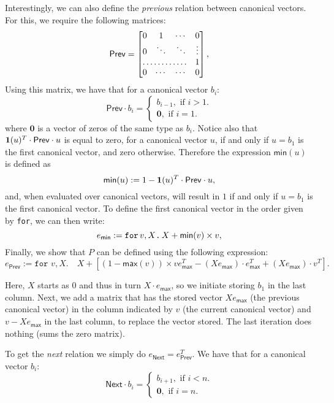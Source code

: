 Interestingly, we can also define the \textit{previous} relation between canonical vectors. 
For this, we require the following matrices:
\[
\mathsf{Prev} = \begin{bmatrix}
    0 & 1 & \cdots &  0 \\
    0 & \ddots & \ddots & \vdots \\
    \hdotsfor{3} & 1 \\
    0 & \cdots & \cdots & 0
\end{bmatrix},
\]
Using this matrix, we have that for a canonical vector $b_i$:
\[
\mathsf{Prev}\cdot b_i=\begin{cases}
               b_{i-1}, \text{ if } i > 1. \\
              \mathbf{0}, \text{ if } i = 1.
            \end{cases}
\]
where $\mathbf{0}$ is a vector of zeros of the same type as $b_i$. Notice also that $\mathbf{1}(u)^T\cdot \mathsf{Prev} \cdot u$ is equal to zero, for a canonical vector $u$, if and only if $u = b_1$ is the first canonical vector, and zero otherwise.
Therefore the expression $\mathsf{min}(u)$ is defined as $$\mathsf{min}(u) := 1 - \mathbf{1}(u)^T\cdot \mathsf{Prev} \cdot u,$$ and, when evaluated over canonical vectors, will result in $1$ if and only if $u=b_1$ is the first canonical vector.
To define the first canonical vector in the order given by \texttt{for}, we can then write:
$$e_{\mathsf{min}} := \texttt{for}\, v,X \texttt{.}\, X + \mathsf{min}(v)\times v,$$
Finally, we show that $P$ can be defined using the following \langfor expression:
$$e_{\mathsf{Prev}}:= \texttt{for }v,X.\quad X + \left[ (1 - \mathsf{max}(v))\times ve_{\mathsf{max}}^T - (Xe_{\mathsf{max}})\cdot e_{\mathsf{max}}^T + (Xe_{\mathsf{max}})\cdot v^T\right].$$

Here, $X$ starts as 0 and thus in turn $X\cdot e_{\mathsf{max}}$, so we initiate storing $b_1$ in the last column. Next, we add a matrix that has the stored vector $Xe_{\mathsf{max}}$ (the previous canonical vector) in the column indicated by $v$ (the current canonical vector) and $v-Xe_{\mathsf{max}}$ in the last column, to replace the vector stored.
The last iteration does nothing (sums the zero matrix).

To get the \textit{next} relation we simply do $e_{\mathsf{Next}} = e_{\mathsf{Prev}}^T$. We have that for a canonical vector $b_i$:
\[
\mathsf{Next}\cdot b_i=\begin{cases}
               b_{i+1}, \text{ if } i < n. \\
              \mathbf{0}, \text{ if } i = n.
            \end{cases}
\]

